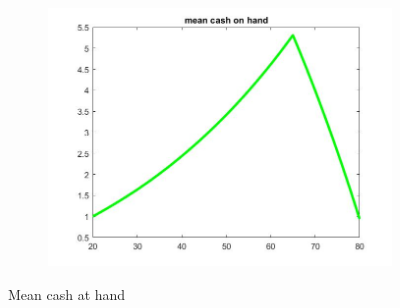 \documentclass[12pt,a4paper]{article}
\begin{document}
\begin{figure}[h!]
\begin{subfigure}[b]{0.32\linewidth}
    \includegraphics[width=\linewidth]{graphs/Q2/mean_x3.jpg}
  \end{subfigure}
  \caption{Mean cash at hand}
    \label{fig:3}
\end{figure}
\end{document}
